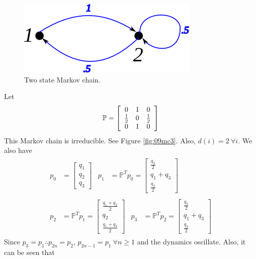 \documentclass[lecture,12pt,]{pcms-l}
\begin{document}
\begin{figure}[ht!]
	\centering
	\includegraphics[width=.4\textwidth]{images/09mc2}
	\caption{Two state Markov chain.}
	\label{fig:09mc2}
\end{figure}

\begin{example}
Let
$$\mathbb{P} = \left[\begin{array}{c c c} 0 & 1 & 0 \\ \frac{1}{2} & 0 & \frac{1}{2} \\ 0 & 1 & 0 \end{array}\right]$$
This Markov chain is irreducible. See Figure \ref{fig:09mc3}. Also, $d(i)=2 ~\forall i$. We also have
\begin{align*}
\begin{split}
p_0 &= \left[\begin{array}{c} q_1 \\ q_2 \\ q_3 \end{array}\right]
\end{split}
\begin{split}
p_1 &= \mathbb{P}^Tp_0 = \left[\begin{array}{c} \frac{q_2}{2} \\ q_1+q_3 \\ \frac{q_2}{2} \end{array}\right]
\end{split} \\
\begin{split}
p_2 &= \mathbb{P}^Tp_1 = \left[\begin{array}{c} \frac{q_1+q_3}{2} \\ q_2 \\ \frac{q_1+q_3}{2} \end{array}\right]
\end{split}
\begin{split}
p_3 &= \mathbb{P}^Tp_2 = \left[\begin{array}{c} \frac{q_2}{2} \\ q_1+q_3 \\ \frac{q_2}{2} \end{array}\right]
\end{split}
\end{align*}
Since $p_3=p_1 \therefore p_{2n}=p_2$, $p_{2n-1}=p_1 ~\forall n\geq1$ and the dynamics oscillate. Also, it can be seen that

\end{example}
\end{document}
